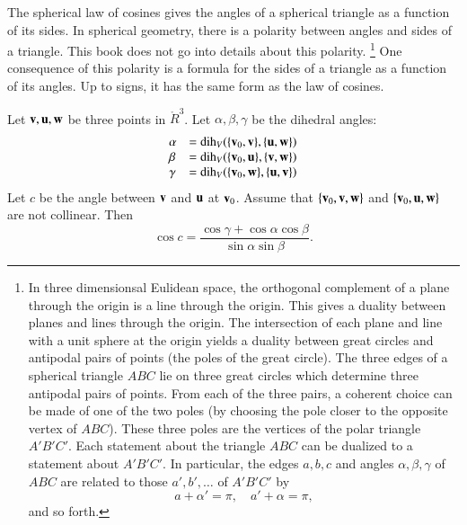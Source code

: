 The spherical law of cosines gives the angles of a spherical
triangle as a function of its sides.  In spherical geometry,
there is a polarity between angles and sides of a triangle.
This book does not go into details about this polarity.%
\footnote{In three dimensionsal Eulidean space, the orthogonal
complement of a plane through the origin is a line through
the origin.  This gives a duality between planes and lines
through the origin.  The intersection of each plane and line with
a unit sphere at the origin yields a duality between great
circles and antipodal
pairs of points (the poles of the great circle).  The three edges
of a spherical triangle $ABC$ lie on three great circles which
determine three
antipodal pairs of points.  From each of the three  pairs, 
a coherent
choice can be made of one of the two poles (by choosing the pole
closer to the opposite vertex of $ABC$).  
These three poles are the vertices
of the polar triangle $A'B'C'$.  Each statement about the triangle $ABC$
can be dualized to a statement about $A'B'C'$.
In particular, the edges $a,b,c$ and angles $\alpha,\beta,\gamma$ of $ABC$ 
are related to those $a',b',\ldots$ of $A'B'C'$ by
   $$
   a + \alpha' = \pi,\quad a' + \alpha= \pi,
   $$
and so forth.
}  %
One
consequence of this polarity is a formula for the sides of
a triangle as a function of its angles.  Up to signs,
it has the same form as the law of cosines.
%

\begin{lemma}
\label{lemma:sloc2}
Let ${\mathbf v},{\mathbf u},{\mathbf w}$ be three points in $\ring{R}^3$.
Let $\alpha,\beta,\gamma$ be the dihedral angles: 
   $$
   \begin{array}{lll}
     \alpha &= \operatorname{dih}_V(\{{\mathbf v}_0,{\mathbf v}\},\{{\mathbf u},{\mathbf w}\})\\
     \beta &= \operatorname{dih}_V(\{{\mathbf v}_0,{\mathbf u}\},\{{\mathbf v},{\mathbf w}\})\\
     \gamma&= \operatorname{dih}_V(\{{\mathbf v}_0,{\mathbf w}\},\{{\mathbf u},{\mathbf v}\})\\
     \end{array}
   $$
Let $c$ be the
angle between ${\mathbf v}$ and ${\mathbf u}$ at ${\mathbf v}_0$. 
Assume that $\{{\mathbf v}_0,{\mathbf v},{\mathbf w}\}$ and $\{{\mathbf v}_0,{\mathbf u},{\mathbf w}\}$ are not collinear.
Then
    $$
    \cos c = \frac{\cos \gamma + \cos \alpha \cos \beta}
     {\sin \alpha\sin \beta}.
    $$
\end{lemma}
%
%

